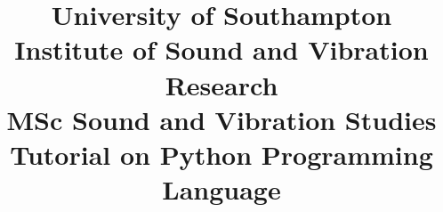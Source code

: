 \documentclass[a4paper,twoside,12pt]{article}
\title{\vspace{-2cm} University of Southampton\\Institute of Sound and Vibration Research\\MSc Sound and Vibration Studies\\Tutorial on Python Programming Language}
\begin{document}
	\maketitle
	\date{}
	
	\begingroup
	\let\clearpage\relax
	\tableofcontents
	\endgroup
	
	
		
\end{document}
